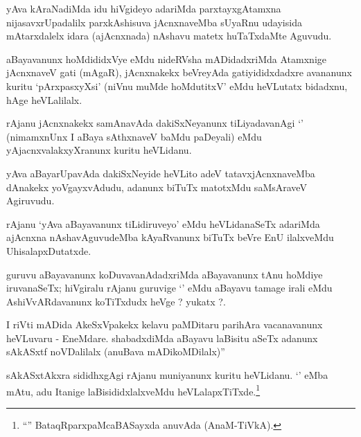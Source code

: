 \begin{artha}
yAva kAraNadiMda idu hiVgideyo adariMda parxtayxgAtamxna nijasavxrUpadalilx parxkAshisuva jAcnxnaveMba sUyaRnu udayisida mAtarxdalelx idara (ajAcnxnada) nAshavu matetx huTaTxdaMte Aguvudu.
\end{artha}


\begin{artha}
aBayavanunx hoMdididxVye eMdu nideRVsha mADidadxriMda Atamxnige jAcnxnaveV gati (mAgaR), jAcnxnakekx beVreyAda gatiyididxdadxre avananunx kuritu `pArxpasxyXsi' (niVnu muMde hoMdutitxV' eMdu heVLutatx bidadxnu, hAge heVLalilalx.
\end{artha}

\begin{artha}
rAjanu jAcnxnakekx samAnavAda dakiSxNeyanunx tiLiyadavanAgi `\stext' (nimamxnUnx I aBaya sAthxnaveV baMdu paDeyali) eMdu yAjacnxvalakxyXranunx kuritu heVLidanu.
\end{artha}

\begin{artha}
yAva aBayarUpavAda dakiSxNeyide heVLito adeV tatavxjAcnxnaveMba dAnakekx yoVgayxvAdudu, adanunx biTuTx matotxMdu saMsAraveV Agiruvudu.
\end{artha}


\begin{artha}
rAjanu `yAva aBayavanunx tiLidiruveyo' eMdu heVLidanaSeTx adariMda ajAcnxna nAshavAguvudeMba kAyaRvanunx biTuTx beVre EnU ilalxveMdu UhisalapxDutatxde.
\end{artha}


\begin{artha}
guruvu aBayavanunx koDuvavanAdadxriMda aBayavanunx tAnu hoMdiye iruvanaSeTx; hiVgiralu rAjanu guruvige `\stext' eMdu aBayavu tamage irali eMdu AshiVvARdavanunx koTiTxdudx heVge ? yukatx ?.
\end{artha}


\begin{artha}
I riVti mADida AkeSxVpakekx kelavu paMDitaru parihAra vacanavanunx heVLuvaru - EneMdare. shabadxdiMda aBayavu laBisitu aSeTx adanunx sAkASxtf noVDalilalx (anuBava mADikoMDilalx)''
\end{artha}

\begin{artha}
sAkASxtAkxra sididhxgAgi rAjanu muniyanunx kuritu heVLidanu. `\stext' eMba mAtu, adu Itanige laBisididxlalxveMdu heVLalapxTiTxde.\footnote{``\stext'' BataqRparxpaMcaBASayxda anuvAda (AnaM-TiVkA).}
\end{artha}

